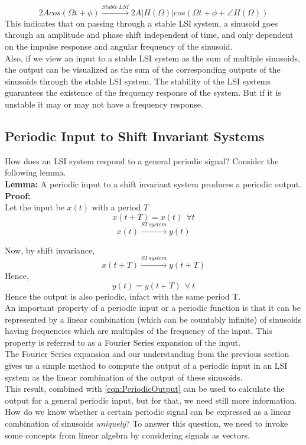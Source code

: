 \[
2Acos(\Omega t + \phi) \xrightarrow{Stable\ LSI} 2A|H(\Omega)|cos(\Omega t + \phi + \angle H(\Omega))
\]
This indicates that on passing through a stable LSI system, a sinusoid goes through an amplitude and phase shift independent of time, and only dependent on the impulse response and angular frequency of the sinusoid.\\
Also, if we view an input to a stable LSI system as the sum of multiple sinusoids, the output can be visualized as the sum of the corresponding outputs of the sinusoids through the stable LSI system. The stability of the LSI systems guarantees the existence of the frequency response of the system. But if it is unstable it may or may not have a frequency response.


\subsection{Periodic Input to Shift Invariant Systems}
How does an LSI system respond to a general periodic signal? Consider the following lemma.\\
\textbf{Lemma:} A periodic input to a shift invariant system produces a periodic output.\\
\textbf{Proof:}\\

Let the input be $x(t)$ with a period $T$
\[x(t+T) = x(t)\ \ \forall t\]
\[x(t) \xrightarrow{SI\ system} y(t) \]

Now, by shift invariance,
\[x(t+T) \xrightarrow{SI\ system} y(t+T) \]
Hence,
\begin{equation}\label{eqn:PeriodicOutput}
y(t) = y(t+T)\ \ \forall \ t
\end{equation}
Hence the output is also periodic, infact with the same period T.\\
An important property of a periodic input or a periodic function is that it can be represented by a linear combination (which can be countably infinite) of sinusoids having frequencies which are multiples of the frequency of the input. This property is referred to as a Fourier Series expansion of the input. \\
The Fourier Series expansion and our understanding from the previous section gives us a simple method to compute the output of a periodic input in an LSI system as the linear combination of the output of these sinusoids.\\
This result, combined with \ref{eqn:PeriodicOutput} can be used to calculate the output for a general periodic input, but for that, we need still more information. How do we know whether a certain periodic signal can be expressed as a linear combination of sinusoids \emph{uniquely}? To answer this question, we need to invoke some concepts from linear algebra by considering signals as vectors.


